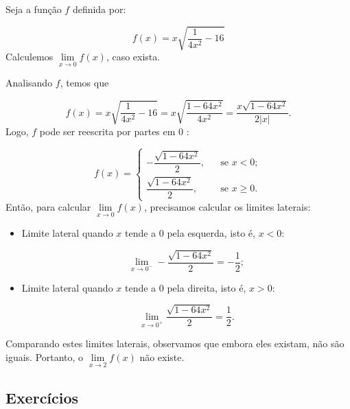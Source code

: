 \cleardoublepage\documentclass[../main.tex]{subfiles}
\begin{document}
\begin{exeresol}
  Seja a função \( f\) definida por:

\[ f(x)=x\sqrt{\dfrac{1}{4x^2}-16} \]
Calculemos \(\lim\limits_{x \to 0} f(x)\), caso exista.\\
\begin{resol}
  Analisando \(f\), temos que

\[ f(x)= x\sqrt{\dfrac{1}{4x^2}-16} = x\sqrt{\dfrac{1-64x^2}{4x^2}} = \dfrac{x\sqrt{1-64x^2}}{2|x|}. \]
Logo, \(f\) pode ser reescrita por partes em \( 0\) :

\[f(x)=\left\{\begin{array}{ccl} -\dfrac{\sqrt{1-64x^2}}{2}, & &\mbox{se } x<0; \\ \dfrac{\sqrt{1-64x^2}}{2}, & &\mbox{se } x\geq 0 . \end{array}\right. \]
Então, para calcular \(\lim\limits_{x \to 0} f(x)\), precisamos calcular os limites laterais:
\begin{itemize}
    \item Limite lateral quando \( x\) tende a \(0\) pela esquerda, isto é, \(x<0\):

\[ \lim\limits_{x \to 0^{-}} -\dfrac{\sqrt{1-64x^2}}{2}= -\dfrac{1}{2}; \]
\item Limite lateral quando \( x\) tende a \(0\) pela direita, isto é, \( x>0\):

\[ \lim\limits_{x \to 0^{+}} \dfrac{\sqrt{1-64x^2}}{2}=\dfrac{1}{2}. \]
\end{itemize}

Comparando estes limites laterais, observamos que embora eles existam, não são iguais. Portanto, o \(\lim\limits_{x \to 2} f(x)\) não existe.
\end{resol}
\end{exeresol}
\subsection{Exercícios}
\end{document}
